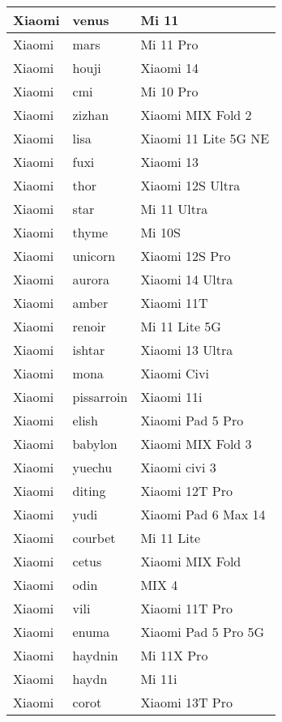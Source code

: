 \begin{tabularx}{\linewidth}{|l|X|X|}
        Xiaomi & venus & Mi 11 \\ \hline
        Xiaomi & mars & Mi 11 Pro \\ \hline
        Xiaomi & houji & Xiaomi 14 \\ \hline
        Xiaomi & cmi & Mi 10 Pro \\ \hline
        Xiaomi & zizhan & Xiaomi MIX Fold 2 \\ \hline
        Xiaomi & lisa & Xiaomi 11 Lite 5G NE \\ \hline
        Xiaomi & fuxi & Xiaomi 13 \\ \hline
        Xiaomi & thor & Xiaomi 12S Ultra \\ \hline
        Xiaomi & star & Mi 11 Ultra \\ \hline
        Xiaomi & thyme & Mi 10S \\ \hline
        Xiaomi & unicorn & Xiaomi 12S Pro \\ \hline
        Xiaomi & aurora & Xiaomi 14 Ultra \\ \hline
        Xiaomi & amber & Xiaomi 11T \\ \hline
        Xiaomi & renoir & Mi 11 Lite 5G \\ \hline
        Xiaomi & ishtar & Xiaomi 13 Ultra \\ \hline
        Xiaomi & mona & Xiaomi Civi \\ \hline
        Xiaomi & pissarroin & Xiaomi 11i \\ \hline
        Xiaomi & elish & Xiaomi Pad 5 Pro \\ \hline
        Xiaomi & babylon & Xiaomi MIX Fold 3 \\ \hline
        Xiaomi & yuechu & Xiaomi civi 3 \\ \hline
        Xiaomi & diting & Xiaomi 12T Pro \\ \hline
        Xiaomi & yudi & Xiaomi Pad 6 Max 14 \\ \hline
        Xiaomi & courbet & Mi 11 Lite \\ \hline
        Xiaomi & cetus & Xiaomi MIX Fold \\ \hline
        Xiaomi & odin & MIX 4 \\ \hline
        Xiaomi & vili & Xiaomi 11T Pro \\ \hline
        Xiaomi & enuma & Xiaomi Pad 5 Pro 5G \\ \hline
        Xiaomi & haydnin & Mi 11X Pro \\ \hline
        Xiaomi & haydn & Mi 11i \\ \hline
        Xiaomi & corot & Xiaomi 13T Pro \\ \hline

\end{tabularx}
